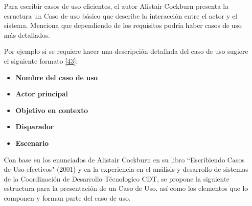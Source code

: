 Para escribir casos de uso eficientes, el autor Alistair Cockburn presenta la esructura un Caso de uso básico que describe la interacción entre el actor y el sistema. Menciona que dependiendo de los requisitos podría haber casos de uso más detallados. 

Por ejemplo si se requiere hacer una descripción detallada del caso de uso sugiere el siguiente formato \hyperlink{b43}{[43]}: 

\begin{itemize}
\item \textbf{Nombre del caso de uso}
\item \textbf{Actor principal}
\item \textbf{Objetivo en contexto} 
\item \textbf{Disparador} 
\item \textbf{Escenario} 
\end{itemize}

Con base en los enunciados de Alistair Cockburn en su libro ``Escribiendo Casos de Uso efectivos" (2001) y en la experiencia en el análisis y desarrollo de sistemas de la Coordinación de Desarrollo Técnologico CDT, se propone la siguiente estructura para la presentación de un Caso de Uso, así como los elementos que lo componen y forman parte del caso de uso.

